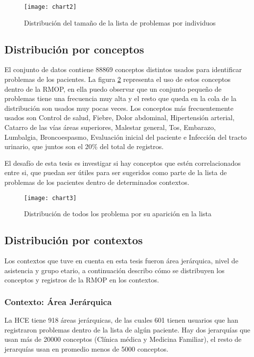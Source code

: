 \begin{figure}[ht]
\caption{Distribución del tamaño de la lista de problemas por individuos}
\label{fig:listaIndividuos}
\centering
\texttt{[image: chart2]}
\end{figure}

\subsection{Distribución por conceptos}
El conjunto de datos contiene \num{88869} conceptos distintos usados para identificar problemas de los pacientes. La figura \ref{fig:listaProblemas} representa el uso de estos conceptos dentro de la RMOP, en ella puedo observar que un conjunto pequeño de problemas tiene una frecuencia muy alta y el resto que queda en la cola de la distribución son usados muy pocas veces. Los conceptos más frecuentemente usados son Control de salud, Fiebre, Dolor abdominal,  Hipertensión arterial, Catarro de las vías áreas superiores, Malestar general, Tos, Embarazo, Lumbalgia, Broncoespasmo, Evaluación inicial del paciente e Infección del tracto urinario, que juntos son el \num{20}\% del total de registros. 

El desafío de esta tesis es investigar si hay conceptos que estén correlacionados entre si, que puedan ser útiles para ser sugeridos como parte de la lista de problemas de los pacientes dentro de determinados contextos. 

\begin{figure}[ht]
\caption{Distribución de todos los problema por su aparición en la lista}
\label{fig:listaProblemas}
\centering
\texttt{[image: chart3]}
\end{figure}

\subsection{Distribución por contextos}
Los contextos que tuve en cuenta en esta tesis fueron área jerárquica, nivel de asistencia y grupo etario, a continuación describo cómo se distribuyen los conceptos y registros de la RMOP en los contextos.


\subsubsection{Contexto: Área Jerárquica}
La HCE tiene 918 áreas jerárquicas, de las cuales 601 tienen usuarios que han registraron problemas dentro de la lista de algún paciente. Hay dos jerarquías que usan más de \num{20000} conceptos (Clínica médica y Medicina Familiar), el resto de jerarquías usan en promedio menos de 5000 conceptos. 

